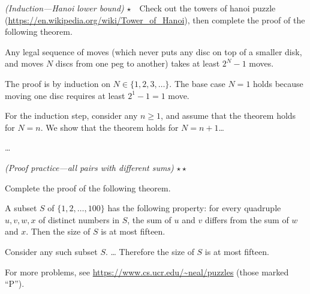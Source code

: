 \exercise \emph{(Induction---Hanoi lower bound)} $\star$~~Check out the towers of hanoi puzzle (\url{https://en.wikipedia.org/wiki/Tower_of_Hanoi}),
then complete the proof of the following theorem.

\begin{theorem}
  Any legal sequence of moves (which never puts any disc on top of a smaller disk,
  and moves $N$ discs from one peg to another) takes at least $2^N-1$ moves.
\end{theorem}

\begin{longFormProof}
  \step The proof is by induction on $N\in\{1,2,3,\ldots\}$.
  \step The base case $N=1$ holds because moving one disc requires at least $2^1-1 = 1$ move.
  \begin{block}
    \step For the induction step, consider any $n\ge 1$,
    and assume that the theorem holds for $N=n$.
    \step We show that the theorem holds for $N=n+1$\ldots
  \end{block}
  \step \ldots
\end{longFormProof}



\exercise \emph{(Proof practice---all pairs with different sums)} $\star \star$

Complete the proof of the following theorem.
\begin{theorem}
  A subset $S$ of $\{1,2,\ldots ,100\}$ has the following property:
  for every quadruple $u,v,w,x$ of distinct numbers in $S$, the sum of $u$ and $v$ 
  differs from the sum of $w$ and $x$.
  Then the size of $S$ is at most fifteen.
\end{theorem}
\begin{longFormProof}
  \step Consider any such subset $S$.
  \step \ldots
  \step Therefore the size of $S$ is at most fifteen.
\end{longFormProof}

For more problems, see \url{https://www.cs.ucr.edu/~neal/puzzles} (those marked ``P'').


